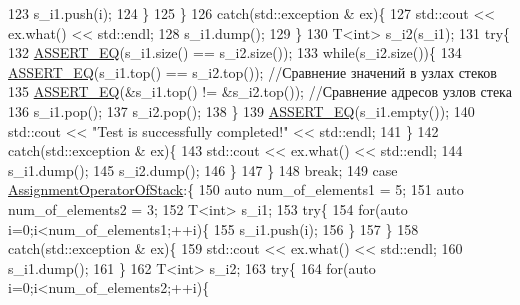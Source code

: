 \begin{DoxyCode}
123                         s\_i1.push(i);
124                     \}
125                 \}
126                 \textcolor{keywordflow}{catch}(std::exception & ex)\{
127                     std::cout << ex.what() << std::endl;
128                     s\_i1.dump();
129                 \}
130                 T<int> s\_i2(s\_i1);
131                 \textcolor{keywordflow}{try}\{
132                     \hyperlink{main__file_8cpp_a12d9e096a8640ee0477e1cb3505c21b3}{ASSERT\_EQ}(s\_i1.size() == s\_i2.size());
133                     \textcolor{keywordflow}{while}(s\_i2.size())\{
134                         \hyperlink{main__file_8cpp_a12d9e096a8640ee0477e1cb3505c21b3}{ASSERT\_EQ}(s\_i1.top() == s\_i2.top());   \textcolor{comment}{//Сравнение значений в узлах стеков}
135                         \hyperlink{main__file_8cpp_a12d9e096a8640ee0477e1cb3505c21b3}{ASSERT\_EQ}(&s\_i1.top() != &s\_i2.top()); \textcolor{comment}{//Сравнение адресов узлов стека}
136                         s\_i1.pop();
137                         s\_i2.pop();
138                     \}
139                     \hyperlink{main__file_8cpp_a12d9e096a8640ee0477e1cb3505c21b3}{ASSERT\_EQ}(s\_i1.empty());
140                     std::cout << \textcolor{stringliteral}{"Test is successfully completed!"} << std::endl;
141                 \}
142                 \textcolor{keywordflow}{catch}(std::exception & ex)\{
143                     std::cout << ex.what() << std::endl;
144                     s\_i1.dump();
145                     s\_i2.dump();
146                 \}
147                               \}
148                 \textcolor{keywordflow}{break};
149             \textcolor{keywordflow}{case} \hyperlink{namespacestk__test_aee7ec7a767abf7b0b65ce9a2afb7de78adc3b2cd62978794a43af9212cd2c6be7}{AssignmentOperatorOfStack}:\{
150                 \textcolor{keyword}{auto} num\_of\_elements1 = 5;
151                 \textcolor{keyword}{auto} num\_of\_elements2 = 3;
152                 T<int> s\_i1;
153                 \textcolor{keywordflow}{try}\{
154                     \textcolor{keywordflow}{for}(\textcolor{keyword}{auto} i=0;i<num\_of\_elements1;++i)\{
155                         s\_i1.push(i);
156                     \}
157                 \}
158                 \textcolor{keywordflow}{catch}(std::exception & ex)\{
159                     std::cout << ex.what() << std::endl;
160                     s\_i1.dump();
161                 \}
162                 T<int> s\_i2;
163                 \textcolor{keywordflow}{try}\{
164                     \textcolor{keywordflow}{for}(\textcolor{keyword}{auto} i=0;i<num\_of\_elements2;++i)\{

\end{DoxyCode}
